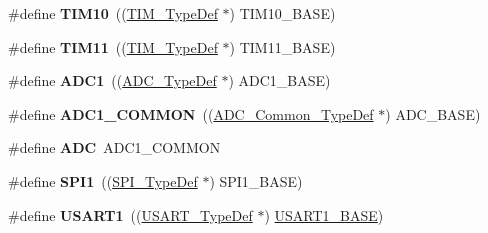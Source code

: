 \begin{DoxyCompactItemize}
\item 
\hypertarget{group___peripheral__declaration_ga46b2ad3f5f506f0f8df0d2ec3e767267}{\#define {\bfseries T\-I\-M10}~((\hyperlink{struct_t_i_m___type_def}{T\-I\-M\-\_\-\-Type\-Def} $\ast$) T\-I\-M10\-\_\-\-B\-A\-S\-E)}\label{group___peripheral__declaration_ga46b2ad3f5f506f0f8df0d2ec3e767267}

\item 
\hypertarget{group___peripheral__declaration_gacfd11ef966c7165f57e2cebe0abc71ad}{\#define {\bfseries T\-I\-M11}~((\hyperlink{struct_t_i_m___type_def}{T\-I\-M\-\_\-\-Type\-Def} $\ast$) T\-I\-M11\-\_\-\-B\-A\-S\-E)}\label{group___peripheral__declaration_gacfd11ef966c7165f57e2cebe0abc71ad}

\item 
\hypertarget{group___peripheral__declaration_ga90d2d5c526ce5c0a551f533eccbee71a}{\#define {\bfseries A\-D\-C1}~((\hyperlink{struct_a_d_c___type_def}{A\-D\-C\-\_\-\-Type\-Def} $\ast$) A\-D\-C1\-\_\-\-B\-A\-S\-E)}\label{group___peripheral__declaration_ga90d2d5c526ce5c0a551f533eccbee71a}

\item 
\hypertarget{group___peripheral__declaration_gaf1919c64fc774aab31190346fd5457e2}{\#define {\bfseries A\-D\-C1\-\_\-\-C\-O\-M\-M\-O\-N}~((\hyperlink{struct_a_d_c___common___type_def}{A\-D\-C\-\_\-\-Common\-\_\-\-Type\-Def} $\ast$) A\-D\-C\-\_\-\-B\-A\-S\-E)}\label{group___peripheral__declaration_gaf1919c64fc774aab31190346fd5457e2}

\item 
\hypertarget{group___peripheral__declaration_ga54d148b91f3d356713f7e367a2243bea}{\#define {\bfseries A\-D\-C}~A\-D\-C1\-\_\-\-C\-O\-M\-M\-O\-N}\label{group___peripheral__declaration_ga54d148b91f3d356713f7e367a2243bea}

\item 
\hypertarget{group___peripheral__declaration_gad483be344a28ac800be8f03654a9612f}{\#define {\bfseries S\-P\-I1}~((\hyperlink{struct_s_p_i___type_def}{S\-P\-I\-\_\-\-Type\-Def} $\ast$) S\-P\-I1\-\_\-\-B\-A\-S\-E)}\label{group___peripheral__declaration_gad483be344a28ac800be8f03654a9612f}

\item 
\hypertarget{group___peripheral__declaration_ga92871691058ff7ccffd7635930cb08da}{\#define {\bfseries U\-S\-A\-R\-T1}~((\hyperlink{struct_u_s_a_r_t___type_def}{U\-S\-A\-R\-T\-\_\-\-Type\-Def} $\ast$) \hyperlink{group___peripheral__memory__map_ga86162ab3f740db9026c1320d46938b4d}{U\-S\-A\-R\-T1\-\_\-\-B\-A\-S\-E})}\label{group___peripheral__declaration_ga92871691058ff7ccffd7635930cb08da}


\end{DoxyCompactItemize}
